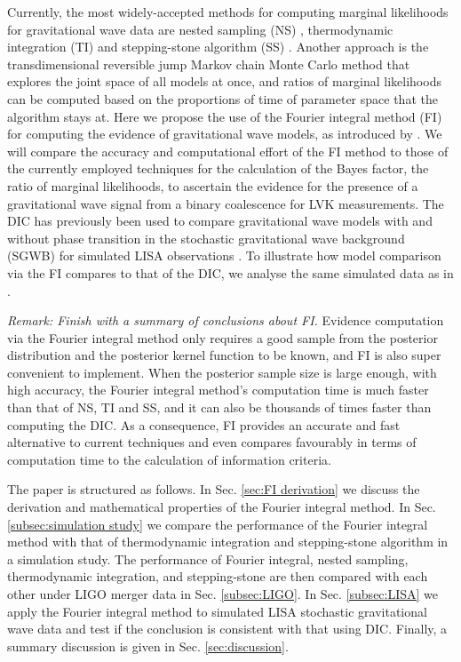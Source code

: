 \documentclass[%
 reprint,
 amsmath,amssymb,
 aps,
]{revtex4-2}
\begin{document}
Currently, the most widely-accepted methods for computing marginal likelihoods for gravitational wave data are nested sampling (NS) \cite{skilling2006nested, veitch2010bayesian}, thermodynamic integration (TI) \cite{gelman1998simulating, lartillot2006computing} and stepping-stone algorithm (SS) \cite{xie2011improving, maturana2019stepping}. Another approach is the transdimensional reversible jump Markov chain Monte Carlo method \cite{green1995reversible, umstatter2005bayesian} that explores the joint space of all models at once, and ratios of marginal likelihoods can be computed based on the proportions of time of parameter space that the algorithm stays at. Here we propose the use of the Fourier integral method (FI) for computing the evidence of  gravitational wave models, as introduced by \cite{rotiroti2022computing}. We will compare the accuracy and computational effort of the FI method to those of the currently employed techniques for the calculation of the Bayes factor, the ratio of marginal likelihoods, to ascertain the evidence for the presence of a gravitational wave signal from a binary coalescence for LVK measurements. The DIC has previously been used to compare gravitational wave models with and without phase transition in the stochastic gravitational wave background (SGWB) for simulated LISA observations \cite{BoileauGuillaume2023PfLt}. To illustrate how model comparison via the FI compares to that of the DIC, we analyse the same simulated data as in \cite{BoileauGuillaume2023PfLt}.

{\em Remark: Finish with a summary of conclusions about FI.}
Evidence computation via the Fourier integral method only requires a good sample from the posterior distribution and the posterior kernel function to be known, and FI is also super convenient to implement. When the posterior sample size is large enough, with high accuracy, the Fourier integral method's computation time is much faster than that of NS, TI and SS, and it can also be thousands of times faster than computing the DIC. As a consequence,
FI provides an accurate and fast alternative to current techniques and even compares favourably in terms of computation time to the calculation of information criteria.

The paper is structured as follows. In Sec. \ref{sec:FI derivation} we discuss the derivation and mathematical properties of the Fourier integral method. In Sec. \ref{subsec:simulation study} we compare the performance of the Fourier integral method with that of thermodynamic integration and stepping-stone algorithm in a simulation study. The performance of Fourier integral, nested sampling, thermodynamic integration, and stepping-stone are then compared with each other under LIGO merger data in Sec. \ref{subsec:LIGO}. In Sec. \ref{subsec:LISA} we apply the Fourier integral method to simulated LISA stochastic gravitational wave data and test if the conclusion is consistent with that using DIC. Finally, a summary discussion is given in Sec. \ref{sec:discussion}.
\end{document}
